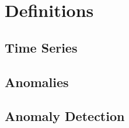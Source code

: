 \section{Definitions}\label{sect:definitions}
\blindtext[1]

\subsection{Time Series}
\blindtext[2]

\subsection{Anomalies}
\blindtext[2]

\subsection{Anomaly Detection}
\blindtext[2]


